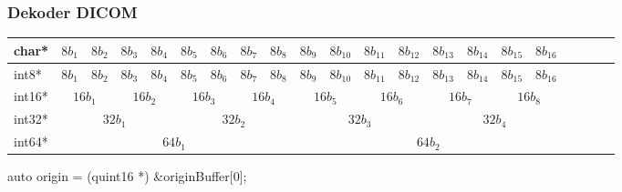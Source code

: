 \documentclass[aspectratio=169]{beamer}
\begin{document}
\begin{frame}[t]
    \frametitle{Dekoder DICOM}
    \begin{center}
        \footnotesize
        \def\arraystretch{1.5}
        \setlength{\tabcolsep}{5pt}
        \begin{tabular}{|l|c|c|c|c|c|c|c|c|c|c|c|c|c|c|c|c|c|c|c|c|}
            \hline
            char*  & $8b_1$                        & $8b_2$                        & $8b_3$                        & $8b_4$                        & $8b_5$                        & $8b_6$                        & $8b_7$                        & $8b_8$                        & $8b_9$ & $8b_10$ & $8b_{11}$ & $8b_{12}$ & $8b_{13}$ & $8b_{14}$ & $8b_{15}$ & $8b_{16}$ \\
            \hline
            int8*  & $8b_1$                        & $8b_2$                        & $8b_3$                        & $8b_4$                        & $8b_5$                        & $8b_6$                        & $8b_7$                        & $8b_8$                        & $8b_9$ & $8b_10$ & $8b_{11}$ & $8b_{12}$ & $8b_{13}$ & $8b_{14}$ & $8b_{15}$ & $8b_{16}$ \\
            \hline
            int16* & \multicolumn{2}{|c|}{$16b_1$} & \multicolumn{2}{|c|}{$16b_2$} & \multicolumn{2}{|c|}{$16b_3$} & \multicolumn{2}{|c|}{$16b_4$} & \multicolumn{2}{|c|}{$16b_5$} & \multicolumn{2}{|c|}{$16b_6$} & \multicolumn{2}{|c|}{$16b_7$} & \multicolumn{2}{|c|}{$16b_8$}                                                                                            \\
            \hline
            int32* & \multicolumn{4}{|c|}{$32b_1$} & \multicolumn{4}{|c|}{$32b_2$} & \multicolumn{4}{|c|}{$32b_3$} & \multicolumn{4}{|c|}{$32b_4$}                                                                                                                                                                                                                            \\
            \hline
            int64* & \multicolumn{8}{|c|}{$64b_1$} & \multicolumn{8}{|c|}{$64b_2$}                                                                                                                                                                                                                                                                                            \\
            \hline
        \end{tabular}
    \end{center}

    auto origin = (quint16 *) \&originBuffer[0];
\end{frame}
\end{document}
